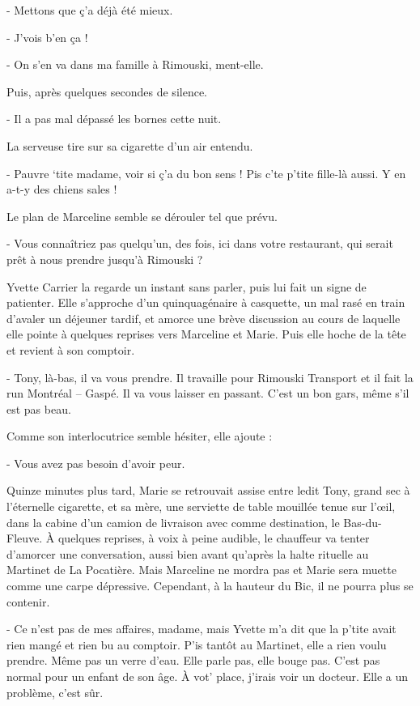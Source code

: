 - Mettons que ç’a déjà été mieux.

- J’vois b’en ça !

- On s’en va dans ma famille à Rimouski, ment-elle.

Puis, après quelques secondes de silence.

- Il a pas mal dépassé les bornes cette nuit.

La serveuse tire sur sa cigarette d’un air entendu.

- Pauvre ‘tite madame, voir si ç’a du bon sens ! Pis c’te p’tite fille-là aussi. Y en a-t-y des chiens sales !

Le plan de Marceline semble se dérouler tel que prévu.

- Vous connaîtriez pas quelqu’un, des fois, ici dans votre restaurant, qui serait prêt à nous prendre jusqu’à Rimouski ?

Yvette Carrier la regarde un instant sans parler, puis lui fait un signe de patienter. Elle s’approche d’un quinquagénaire à casquette, un mal rasé en train d’avaler un déjeuner tardif, et amorce une brève discussion au cours de laquelle elle pointe à quelques reprises vers Marceline et Marie. Puis elle hoche de la tête et revient à son comptoir.

- Tony, là-bas, il va vous prendre. Il travaille pour Rimouski Transport et il fait la run Montréal – Gaspé. Il va vous laisser en passant. C’est un bon gars, même s’il est pas beau.

Comme son interlocutrice semble hésiter, elle ajoute :

- Vous avez pas besoin d’avoir peur.

Quinze minutes plus tard, Marie se retrouvait assise entre ledit Tony, grand sec à l’éternelle cigarette, et sa mère, une serviette de table mouillée tenue sur l’œil, dans la cabine d’un camion de livraison avec comme destination, le Bas-du-Fleuve. À quelques reprises, à voix à peine audible, le chauffeur va tenter d’amorcer une conversation, aussi bien avant qu’après la halte rituelle au Martinet de La Pocatière. Mais Marceline ne mordra pas et Marie sera muette comme une carpe dépressive. Cependant, à la hauteur du Bic, il ne pourra plus se contenir.

- Ce n’est pas de mes affaires, madame, mais Yvette m’a dit que la p’tite avait rien mangé et rien bu au comptoir. P’is tantôt au Martinet, elle a rien voulu prendre. Même pas un verre d’eau. Elle parle pas, elle bouge pas. C’est pas normal pour un enfant de son âge. À vot’ place, j’irais voir un docteur. Elle a un problème, c’est sûr.

